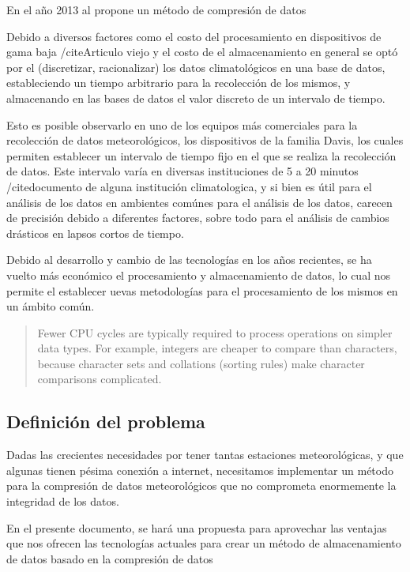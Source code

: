 En el año 2013 al \cite{Improved_Stanchev} propone un método de compresión de datos


Debido a diversos factores como el costo del procesamiento en dispositivos de gama baja /cite{Articulo viejo} y el costo de el almacenamiento en general \cite{Marshall_1994} se optó por el (discretizar, racionalizar) los datos climatológicos en una base de datos, estableciendo un tiempo arbitrario para la recolección de los mismos, y almacenando en las bases de datos el valor discreto de un intervalo de tiempo.

Esto es posible observarlo en uno de los equipos más comerciales para la recolección de datos meteorológicos, los dispositivos de la familia Davis, los cuales permiten establecer un intervalo de tiempo fijo en el que se realiza la recolección de datos. Este intervalo varía en diversas instituciones de 5 a 20 minutos /cite{documento de alguna institución climatologica}, y si bien es útil para el análisis de los datos en ambientes comúnes para el análisis de los datos, carecen de precisión debido a diferentes factores, sobre todo para el análisis de cambios drásticos en lapsos cortos de tiempo.

Debido al desarrollo y cambio de las tecnologías en los años recientes, se ha vuelto más económico el procesamiento y almacenamiento de datos, lo cual nos permite el establecer uevas metodologías para el procesamiento de los mismos en un ámbito común.

\begin{quote}
   Fewer CPU cycles are typically required to process operations on simpler data types. For example, integers are cheaper to compare than characters, because character sets and collations (sorting rules) make character comparisons complicated.
   \cite{Schwartz_2012}
\end{quote}
\subsection{Definición del problema}

Dadas las crecientes necesidades por tener tantas estaciones meteorológicas, y que algunas tienen pésima conexión a internet, necesitamos implementar un método para la compresión de datos meteorológicos que no comprometa enormemente la integridad de los datos.

En el presente documento, se hará una propuesta para aprovechar las ventajas que nos ofrecen las tecnologías actuales para crear un método de almacenamiento de datos basado en la compresión de datos


